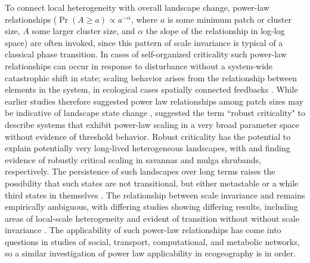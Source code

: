 \documentclass[10pt]{article}
\begin{document}
\begin{linenumbers}
To connect local heterogeneity with overall landscape change, power-law relationships  ($\Pr(A \geq a) \propto a^{-\alpha}$, where $a$ is some minimum patch or cluster size, $A$ some larger cluster size, and $\alpha$ the slope of the relationship in log-log space) are often invoked, since this pattern of scale invariance is typical of a classical phase transition.  In cases of self-organized criticality such power-law relationships can occur in response to disturbance without a system-wide catastrophic shift in state; scaling behavior arises from the relationship between elements in the system, in ecological cases spatially connected feedbacks \citep{Bak1987,Sole1995}. While earlier studies therefore suggested power law relationships among patch sizes may be indicative of landscape state change \citep{Rietkerk2004}, \citet{Pascual2005} suggested the term ``robust criticality" to describe systems that exhibit power-law scaling in a very broad parameter space without evidence of threshold behavior. Robust criticality has the potential to explain potentially very long-lived heterogeneous landscapes, with \citet{Scanlon2007} and \citet{Moreno2011} finding evidence of robustly critical scaling in savannas and mulga shrubands, respectively. The persistence of such landscapes over long terms raises the possibility that such states are not transitional, but either metastable or a while third states in themselves \citep{Okin2009,Pascual2005,Sankaran}. The relationship between scale invariance and remains empirically ambiguous, with differing studies showing differing results, including areas of local-scale heterogeneity and evident of transition without without scale invariance \citet{KefiMed,Moreno2011,Maestre2009}.  The applicability of such power-law relationships has come into questions in studies of social, transport, computational, and metabolic networks, so a similar investigation of power law applicability in ecogeography is in order.


\end{linenumbers}
\end{document}
